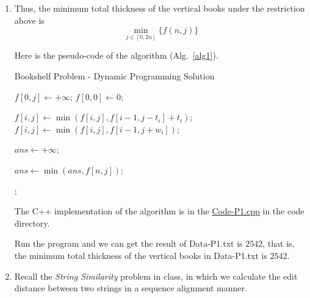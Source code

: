 \documentclass[12pt,a4paper]{article}
\makeatletter
\newtheorem*{solution}{Solution}
\theoremstyle{definition}
\renewenvironment{solution}[1][Solution] {\par\pushQED{\qed}\normalfont\topsep6\p@\@plus6\p@\relax\trivlist\item[\hskip\labelsep\bfseries#1\@addpunct{.}]\ignorespaces}{\popQED\endtrivlist\@endpefalse} \makeatother
\makeatother
\begin{document}
\begin{enumerate}
\begin{solution}
        Thus, the minimum total thickness of the vertical books under the restriction above is
        \begin{displaymath}
        \min_{j \in [0, 2n]}\{f(n,j)\}
        \end{displaymath}

        Here is the pseudo-code of the algorithm (Alg.~\ref{alg1}).

        \begin{minipage}[t]{0.8\textwidth}
        \begin{algorithm}[H]

            \BlankLine
            \caption{Bookshelf Problem - Dynamic Programming Solution}
            \label{alg1}
             {
                 {
                    $f[0, j] \leftarrow +\infty$;
                }
            }
            $f[0, 0] \leftarrow 0$;

             {
                 {
                     {
                        $f[i, j] \leftarrow \min(f[i, j], f[i-1, j-t_i] + t_i)$;
                    }
                     {
                        $f[i, j] \leftarrow \min(f[i, j], f[i-1, j + w_i])$;
                    }
                }
            }

            $ans \leftarrow +\infty$;

             {
                $ans \leftarrow \min(ans, f[n,j])$;
            }

            ;
        \end{algorithm}
        \end{minipage}

        The C++ implementation of the algorithm is in the \href{code/Code-P1.cpp}{Code-P1.cpp} in the code directory.

        Run the program and we can get the result of Data-P1.txt is $2542$, that is, the minimum total thickness of the vertical books in Data-P1.txt is $2542$.
    \end{solution}
    \clearpage

    \item
    Recall the \emph{String Similarity} problem in class, in which we calculate the edit distance between two strings in a sequence alignment manner.


\end{enumerate}
\end{document}
